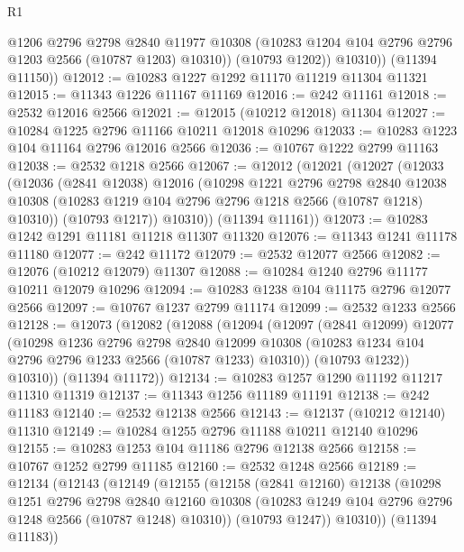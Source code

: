 \begin{lexlean}{R1}
\begin{coremodule}
              @1206
              @2796
              @2798
              @2840
              @11977
              @10308
              (@10283 @1204 @104 @2796 @2796 @1203 @2566 (@10787 @1203) @10310))
            (@10793 @1202))
          @10310))
      (@11394 @11150))
@12012 := @10283 @1227 @1292 @11170 @11219 @11304 @11321
@12015 := @11343 @1226 @11167 @11169
@12016 := @242 @11161
@12018 := @2532 @12016 @2566
@12021 := @12015 (@10212 @12018) @11304
@12027 := @10284 @1225 @2796 @11166 @10211 @12018 @10296
@12033 := @10283 @1223 @104 @11164 @2796 @12016 @2566
@12036 := @10767 @1222 @2799 @11163
@12038 := @2532 @1218 @2566
@12067 := @12012
    (@12021
      (@12027
        (@12033
          (@12036
            (@2841 @12038)
            @12016
            (@10298
              @1221
              @2796
              @2798
              @2840
              @12038
              @10308
              (@10283 @1219 @104 @2796 @2796 @1218 @2566 (@10787 @1218) @10310))
            (@10793 @1217))
          @10310))
      (@11394 @11161))
@12073 := @10283 @1242 @1291 @11181 @11218 @11307 @11320
@12076 := @11343 @1241 @11178 @11180
@12077 := @242 @11172
@12079 := @2532 @12077 @2566
@12082 := @12076 (@10212 @12079) @11307
@12088 := @10284 @1240 @2796 @11177 @10211 @12079 @10296
@12094 := @10283 @1238 @104 @11175 @2796 @12077 @2566
@12097 := @10767 @1237 @2799 @11174
@12099 := @2532 @1233 @2566
@12128 := @12073
    (@12082
      (@12088
        (@12094
          (@12097
            (@2841 @12099)
            @12077
            (@10298
              @1236
              @2796
              @2798
              @2840
              @12099
              @10308
              (@10283 @1234 @104 @2796 @2796 @1233 @2566 (@10787 @1233) @10310))
            (@10793 @1232))
          @10310))
      (@11394 @11172))
@12134 := @10283 @1257 @1290 @11192 @11217 @11310 @11319
@12137 := @11343 @1256 @11189 @11191
@12138 := @242 @11183
@12140 := @2532 @12138 @2566
@12143 := @12137 (@10212 @12140) @11310
@12149 := @10284 @1255 @2796 @11188 @10211 @12140 @10296
@12155 := @10283 @1253 @104 @11186 @2796 @12138 @2566
@12158 := @10767 @1252 @2799 @11185
@12160 := @2532 @1248 @2566
@12189 := @12134
    (@12143
      (@12149
        (@12155
          (@12158
            (@2841 @12160)
            @12138
            (@10298
              @1251
              @2796
              @2798
              @2840
              @12160
              @10308
              (@10283 @1249 @104 @2796 @2796 @1248 @2566 (@10787 @1248) @10310))
            (@10793 @1247))
          @10310))
      (@11394 @11183))

\end{coremodule}
\end{lexlean}
